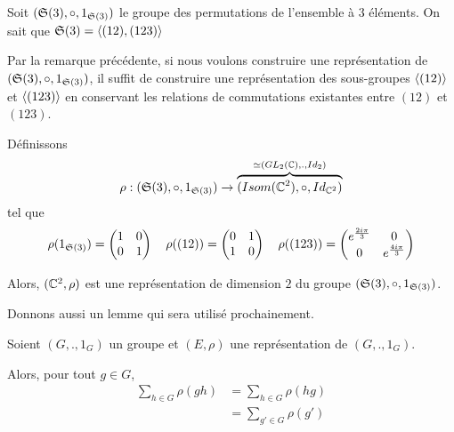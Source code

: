 \begin{exemple}
	Soit $(\mathfrak{S}(3), \circ, 1_{\mathfrak{S}(3)})$ le groupe des permutations de l'ensemble à $3$ éléments.
	On sait que $\mathfrak{S}(3) = \left<(1 2), (1 2 3)\right>$

	Par la remarque précédente, si nous voulons construire une représentation de
	$(\mathfrak{S}(3), \circ, 1_{\mathfrak{S}(3)})$, il suffit de construire une représentation des sous-groupes
	$\left<(1 2)\right>$ et $\left<(1 2 3)\right>$ en conservant les
	relations de commutations existantes entre $(1 2)$ et $(1 2 3)$.

	Définissons
	\begin{equation}
		\rho : (\mathfrak{S}(3), \circ, 1_{\mathfrak{S}(3)})
		\rightarrow \overbrace{(Isom(\mathbb{C}^{2}), \circ,
		Id_{\mathbb{C}^{2}})}^{\simeq (GL_{2}(\mathbb{C}),
		., Id_{2})}
	\end{equation}
		tel que
	\begin{equation}
		\rho(1_{\mathfrak{S}(3)}) =
		\begin{pmatrix}
			1 & 0 \\
			0 & 1
		\end{pmatrix}
		\quad
		\rho( (1 2) ) =
		\begin{pmatrix}
			0 & 1 \\
			1 & 0
		\end{pmatrix}
		\quad
		\rho( (1 2 3) ) =
		\begin{pmatrix}
			e^{\frac{2i\pi}{3}} 	&	0 \\
			0						&	e^{\frac{4i\pi}{3}}
		\end{pmatrix}
	\end{equation}

	Alors, $(\mathbb{C}^{2}, \rho)$ est une représentation de dimension $2$ du
	groupe $(\mathfrak{S}(3), \circ, 1_{\mathfrak{S}(3)})$.
\end{exemple}

Donnons aussi un lemme qui sera utilisé prochainement.

\begin{lemma}
	Soient $(G, ., 1_{G})$ un groupe et $(E, \rho)$ une représentation de $(G, ., 1_{G})$.

	Alors, pour tout $g \in G$,
	\begin{align}
		\sum_{h \in G} \rho(gh) & = \sum_{h \in G} \rho(hg) \\
		& = \sum_{g' \in G} \rho(g')
	\end{align}
\end{lemma}

